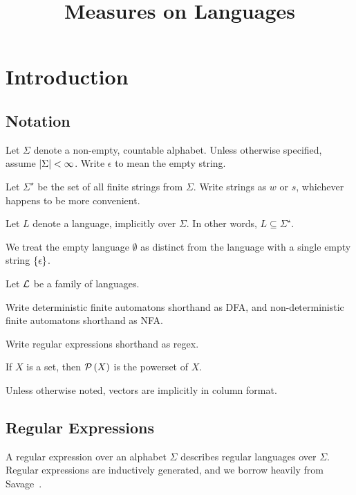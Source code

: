\documentclass[12pt]{article}
\title{Measures on Languages}
\date{}
\begin{document}
\maketitle

\section{Introduction}

\subsection{Notation}

Let \(\Sigma\) denote a non-empty, countable alphabet.
Unless otherwise specified, assume \(\left\lvert\Sigma\right\rvert < \infty\).
Write \(\epsilon\) to mean the empty string.

Let \(\Sigma^\star\) be the set of all finite strings from \(\Sigma\).
Write strings as \(w\) or \(s\), whichever happens to be more convenient.

Let \(L\) denote a language, implicitly over \(\Sigma\).
In other words, \(L \subseteq \Sigma^\star\).

We treat the empty language \(\emptyset\) as distinct from
the language with a single empty string \(\left\{\epsilon\right\}\).

Let \(\mathcal{L}\) be a family of languages.

Write deterministic finite automatons shorthand as DFA,
and non-deterministic finite automatons shorthand as NFA.

Write regular expressions shorthand as regex.

If \(X\) is a set, then \(\mathcal{P}\left(X\right)\) is the powerset of \(X\).

Unless otherwise noted, vectors are implicitly in column format.


\subsection{Regular Expressions}
A regular expression over an alphabet \(\Sigma\) describes regular
languages over \(\Sigma\).
Regular expressions are inductively generated,
and we borrow heavily from Savage~\cite{savage1998models}.
\end{document}
